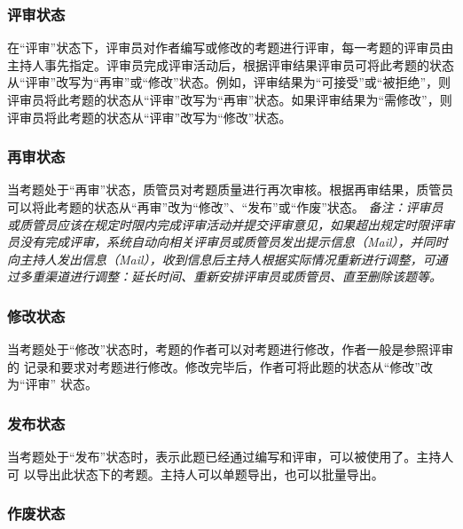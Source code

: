 \documentclass[hyperref, a4paper]{ctexart}
\begin{document}
\hypertarget{ux8bc4ux5ba1ux72b6ux6001}{%
\subsubsection{评审状态}\label{ux8bc4ux5ba1ux72b6ux6001}}

在``评审''状态下，评审员对作者编写或修改的考题进行评审，每一考题的评审员由主持人事先指定。评审员完成评审活动后，根据评审结果评审员可将此考题的状态从``评审''改写为``再审''或``修改''状态。例如，评审结果为``可接受''或``被拒绝''，则评审员将此考题的状态从``评审''改写为``再审''状态。如果评审结果为``需修改''，则评审员将此考题的状态从``评审''改写为``修改''状态。

\hypertarget{ux518dux5ba1ux72b6ux6001}{%
\subsubsection{再审状态}\label{ux518dux5ba1ux72b6ux6001}}

当考题处于``再审''状态，质管员对考题质量进行再次审核。根据再审结果，质管员可以将此考题的状态从``再审''改为``修改''、``发布''或``作废''状态。
\emph{备注：评审员或质管员应该在规定时限内完成评审活动并提交评审意见，如果超出规定时限评审员没有完成评审，系统自动向相关评审员或质管员发出提示信息（Mail），并同时向主持人发出信息（Mail），收到信息后主持人根据实际情况重新进行调整，可通过多重渠道进行调整：延长时间、重新安排评审员或质管员、直至删除该题等。}

\hypertarget{ux4feeux6539ux72b6ux6001}{%
\subsubsection{修改状态}\label{ux4feeux6539ux72b6ux6001}}

当考题处于``修改''状态时，考题的作者可以对考题进行修改，作者一般是参照评审的
记录和要求对考题进行修改。修改完毕后，作者可将此题的状态从``修改''改为``评审''
状态。

\hypertarget{ux53d1ux5e03ux72b6ux6001}{%
\subsubsection{发布状态}\label{ux53d1ux5e03ux72b6ux6001}}

当考题处于``发布''状态时，表示此题已经通过编写和评审，可以被使用了。主持人可
以导出此状态下的考题。主持人可以单题导出，也可以批量导出。

\hypertarget{ux4f5cux5e9fux72b6ux6001}{%
\subsubsection{作废状态}\label{ux4f5cux5e9fux72b6ux6001}}
\end{document}
